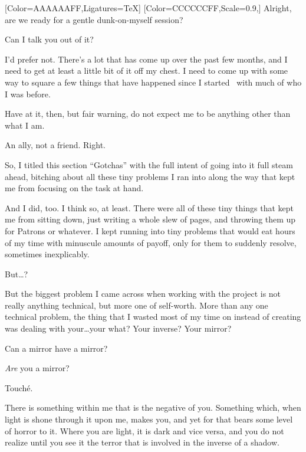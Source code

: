 \begin{paracol}{2}
\begin{leftcolumn}
\end{leftcolumn}
\begin{rightcolumn}
  [Color=AAAAAAFF,Ligatures=TeX]
  \renewfontfamily{}[Color=CCCCCCFF,Scale=0.9,]
  \noindent Alright, are we ready for a gentle dunk-on-myself session?
  
  \begin{ally}
    Can I talk you out of it?
  \end{ally}
  I'd prefer not. There's a lot that has come up over the past few months, and I need to get at least a little bit of it off my chest. I need to come up with some way to square a few things that have happened since I started \allyWord\ with much of who I was before.

  \begin{ally}
    Have at it, then, but fair warning, do not expect me to be anything other than what I am.
  \end{ally}
  An ally, not a friend. Right.

  So, I titled this section ``Gotchas'' with the full intent of going into it full steam ahead, bitching about all these tiny problems I ran into along the way that kept me from focusing on the task at hand.

  And I did, too. I think so, at least. There were all of these tiny things that kept me from sitting down, just writing a whole slew of pages, and throwing them up for Patrons or whatever. I kept running into tiny problems that would eat hours of my time with minuscule amounts of payoff, only for them to suddenly resolve, sometimes inexplicably.

  \begin{ally}
    But\ldots{}?
  \end{ally}
  But the biggest problem I came across when working with the project is not really anything technical, but more one of self-worth. More than any one technical problem, the thing that I wasted most of my time on instead of creating was dealing with your\ldots{}your what? Your inverse? Your mirror?

  \begin{ally}
    Can a mirror have a mirror?
  \end{ally}
  \emph{Are} you a mirror?

  \begin{ally}
    Touché.
  \end{ally}
  There is something within me that is the negative of you. Something which, when light is shone through it upon me, makes you, and yet for that bears some level of horror to it. Where you are light, it is dark and vice versa, and you do not realize until you see it the terror that is involved in the inverse of a shadow.


\end{rightcolumn}
\end{paracol}
